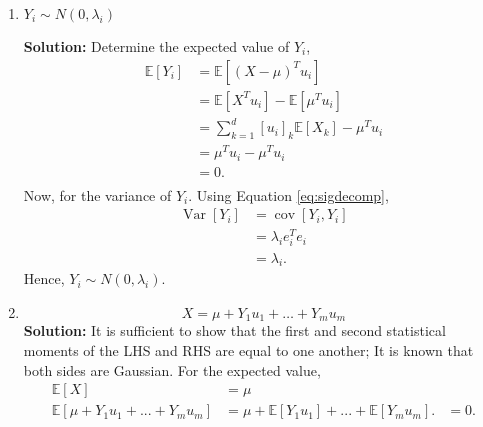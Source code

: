 \documentclass{article}[12pt]
\begin{document}
\begin{enumerate}
\item $Y_i \sim N(0,\lambda_i)$

	\textbf{Solution: }Determine the expected value of $Y_i$,
	\begin{equation}
		\begin{aligned}
			\mathbb E \left[ Y_i \right] &= \mathbb E \left[ \left( X- \mu \right)^T u_i \right] \\
						     &= \mathbb E \left[ X^T u_i \right] - \mathbb E \left[ \mu^T u_i \right] \\
						     &= \sum^{d}_{k=1} \left[ u_i \right]_k \mathbb E \left[ X_k \right] - \mu^T u_i \\
						     &= \mu^T u_i - \mu^T u_i \\
						     &= 0. \\
		\end{aligned}
	\end{equation}
Now, for the variance of $Y_i$. Using Equation \ref{eq:sigdecomp},
\begin{equation}
	\begin{aligned}
		\operatorname{Var} \left[ Y_i \right] &= \operatorname{cov} \left[ Y_i, Y_i \right] \\
						      &= \lambda_i e^T_i e_i \\
						      &= \lambda_i.
	\end{aligned}
\end{equation}
Hence, $Y_i \sim N(0, \lambda_i) $.
	
\item 
\begin{equation}
\label{eq:sample}
X = \mu + Y_1 u_1 + \ldots + Y_m u_m
\end{equation}
\textbf{Solution: } It is sufficient to show that the first and second statistical moments of the LHS and RHS are equal to one another; It is known that both sides are Gaussian. For the expected value,
\begin{equation}
	\begin{aligned}
		\mathbb E \left[ X \right] &= \mu \\
		\mathbb E \left[ \mu + Y_1 u_1 + ... + Y_m u_m \right] &= \mu + \mathbb E \left[ Y_1 u_1 \right] + ... + \mathbb E \left[ Y_m u_m \right]. 
								       &= 0.\\
	\end{aligned}
\end{equation}


\end{enumerate}
\end{document}
